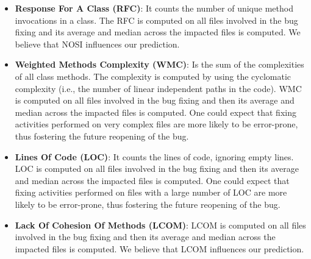 \documentclass[sigconf,review]{acmart}
\begin{document}
\begin{itemize}
\item{\textbf{Response For A Class (RFC)}: It counts the number of unique method invocations in a class. The RFC is computed on all files involved in the bug fixing and its average and median across the impacted files is computed. We believe that NOSI influences our prediction.
}

\item{\textbf{Weighted Methods Complexity (WMC)}: Is the sum of the complexities of all class methods. The complexity is computed 
by using the cyclomatic complexity (i.e., the number of linear independent paths in the code). WMC is computed on all files involved in the bug fixing and then its average and median across the impacted files is computed. One could expect that fixing activities performed on very complex files are more likely to be error-prone, thus fostering the future reopening of the bug.}

\item{\textbf{Lines Of Code (LOC)}: It counts the lines of code, ignoring empty lines. LOC is computed on all files involved in the bug fixing and then its average and median across the impacted files is computed. One could expect that fixing activities performed on files with a large number of LOC are more likely to be error-prone, thus fostering the future reopening of the bug.
}


\item{\textbf{Lack Of Cohesion Of Methods (LCOM)}: LCOM is computed on all files involved in the bug fixing and then its average and median across the impacted files is computed. We believe that LCOM influences our prediction.
}

\end{itemize}

\newpage
\end{document}
